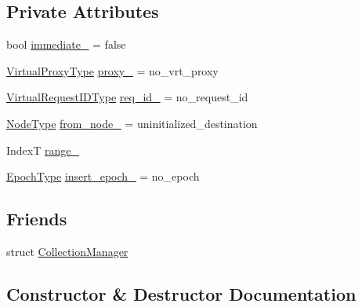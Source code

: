 \subsection*{Private Attributes}
\begin{DoxyCompactItemize}
\item 
bool \hyperlink{structvt_1_1vrt_1_1collection_1_1_collection_info_abee4e28cb909a7e5996274f916138c5e}{immediate\+\_\+} = false
\item 
\hyperlink{namespacevt_a1b417dd5d684f045bb58a0ede70045ac}{Virtual\+Proxy\+Type} \hyperlink{structvt_1_1vrt_1_1collection_1_1_collection_info_abd78f51bda97488527296a6d3535bc06}{proxy\+\_\+} = no\+\_\+vrt\+\_\+proxy
\item 
\hyperlink{namespacevt_1_1vrt_ac7ef8820ebfc383fa16f09bf46eaa2b8}{Virtual\+Request\+I\+D\+Type} \hyperlink{structvt_1_1vrt_1_1collection_1_1_collection_info_a8c14351c09d5dc5464e500b2f2de1fe3}{req\+\_\+id\+\_\+} = no\+\_\+request\+\_\+id
\item 
\hyperlink{namespacevt_a866da9d0efc19c0a1ce79e9e492f47e2}{Node\+Type} \hyperlink{structvt_1_1vrt_1_1collection_1_1_collection_info_a16213a751f7753963ab2671ecab931d3}{from\+\_\+node\+\_\+} = uninitialized\+\_\+destination
\item 
IndexT \hyperlink{structvt_1_1vrt_1_1collection_1_1_collection_info_a1af3d29f3eaab71b2753c85a90900d63}{range\+\_\+}
\item 
\hyperlink{namespacevt_a81d11b28122d43bf9834577e4a06440f}{Epoch\+Type} \hyperlink{structvt_1_1vrt_1_1collection_1_1_collection_info_abe7f0fcf0590be1b024236b1df101149}{insert\+\_\+epoch\+\_\+} = no\+\_\+epoch
\end{DoxyCompactItemize}
\subsection*{Friends}
\begin{DoxyCompactItemize}
\item 
struct \hyperlink{structvt_1_1vrt_1_1collection_1_1_collection_info_af9288b1963f434a90b307b5305a49510}{Collection\+Manager}
\end{DoxyCompactItemize}


\subsection{Constructor \& Destructor Documentation}
\mbox{\label{structvt_1_1vrt_1_1collection_1_1_collection_info_a92a25c0c5f12cc3e97b60ef8d011a348}} 
